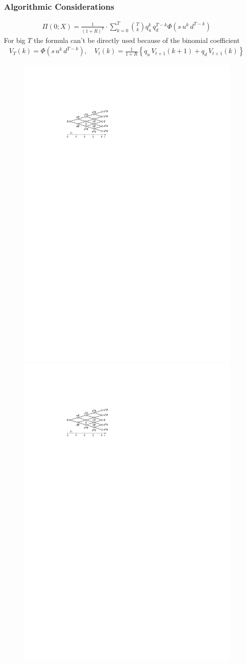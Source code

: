 \documentclass[10pt,handout]{beamer}
\theoremstyle{definition}
\begin{document}
\begin{frame}
  \frametitle{Algorithmic Considerations}
    \begin{align*}
      \Pi(0;X)=\frac{1}{(1 + R)^T}\cdot\sum_{k=0}^T\binom{T}{k}q_u^k\,q_d^{T-k}\Phi(s\,u^k\,d^{T-k})
    \end{align*}
    For big $T$ the formula can't be directly used because of the binomial coefficient
    \begin{align*}
      V_T(k) = \Phi(s\,u^k\,d^{T-k}), \quad V_t(k) = \frac{1}{1+R}\left\{q_u\,V_{t+1}(k+1) + q_d\,V_{t+1}(k)\right\}
    \end{align*}
  \begin{figure}
    \includegraphics[width=.45\textwidth,page=2]{fig/note08/gilli.pdf}
    \includegraphics[width=.45\textwidth,page=3]{fig/note08/gilli.pdf}
  \end{figure}
\end{frame}
\end{document}
